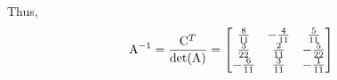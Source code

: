 \begin{example}
    Thus,
    \renewcommand*{\arraystretch}{2.2}
    $$
        \mathrm{A}^{-1} = \frac{\mathrm{C}^T}{\mathrm{det}{(\mathrm{A})}} = 
        \left[\begin{matrix}
        \frac{8}{11} & -\frac{4}{11} & \frac{5}{11} \\
        \frac{3}{22} & \frac{2}{11} & -\frac{5}{22} \\
        -\frac{6}{11} & \frac{3}{11} & -\frac{1}{11}
        \end{matrix}\right]
    $$
\end{example}